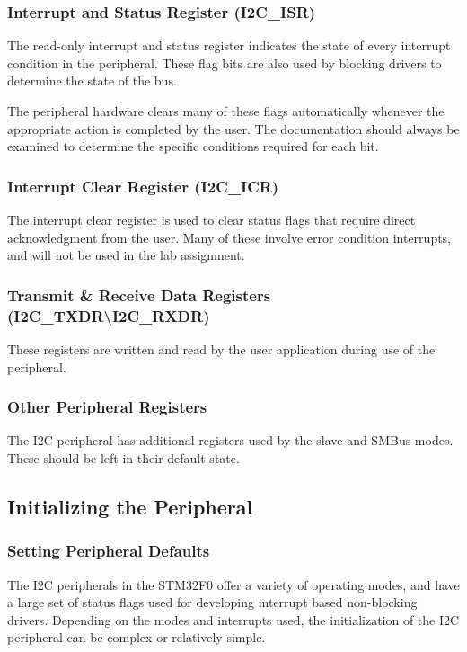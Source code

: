 \documentclass[11pt,fleqn]{book} %
\begin{document}
    \subsubsection{Interrupt and Status Register (I2C\_ISR)}
    The read-only interrupt and status register indicates the state of every interrupt condition in the peripheral. These flag bits are also used by blocking drivers to determine the state of the bus.
    
    The peripheral hardware clears many of these flags automatically whenever the appropriate action is completed by the user. The documentation should always be examined to determine the specific conditions required for each bit. 
    \subsubsection{Interrupt Clear Register (I2C\_ICR)}
    The interrupt clear register is used to clear status flags that require direct acknowledgment from the user. Many of these involve error condition interrupts, and will not be used in the lab assignment.
    
    \subsubsection{Transmit \& Receive Data Registers (I2C\_TXDR{\textbackslash}I2C\_RXDR)}
    These registers are written and read by the user application during use of the peripheral. 
    
    \subsubsection{Other Peripheral Registers}
    The I2C peripheral has additional registers used by the slave and SMBus modes. These should be left in their default state.

\subsection{Initializing the Peripheral}
    
    \subsubsection{Setting Peripheral Defaults}
    
    The I2C peripherals in the STM32F0 offer a variety of operating modes, and have a large set of status flags used for developing interrupt based non-blocking drivers. Depending on the modes and interrupts used, the initialization of the I2C peripheral can be complex or relatively simple. 
    
\end{document}
